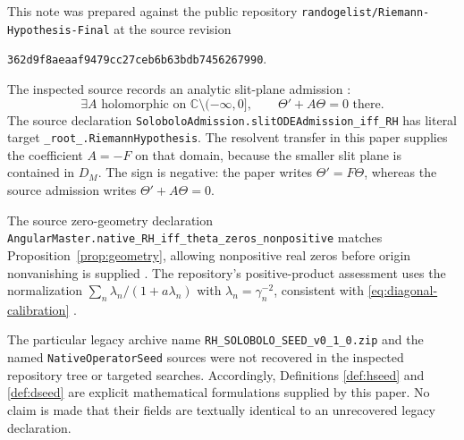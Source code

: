\documentclass[11pt,a4paper]{article}
\numberwithin{equation}{section}
\theoremstyle{definition}
\theoremstyle{remark}
\newcommand{\C}{\mathbb C}
\newcommand{\reposha}{\texttt{362d9f8aeaaf9479cc27ceb6b63bdb7456267990}}
\begin{document}
This note was prepared against the public repository
\texttt{randogelist/Riemann-Hypothesis-Final} at the source revision
\begin{center}\small\reposha.\end{center}
The inspected source records an analytic slit-plane admission
\cite{repo-ode}:
\begin{equation}\label{eq:repo-admission}
\exists A\text{ holomorphic on }\C\setminus(-\infty,0],\qquad
\Theta'+A\Theta=0\text{ there}.
\end{equation}
The source declaration
\nolinkurl{SoloboloAdmission.slitODEAdmission_iff_RH}
has literal target \texttt{\_root\_.RiemannHypothesis}.
The resolvent transfer in this paper supplies the coefficient
$A=-F$ on that domain, because the smaller slit plane is contained
in $D_M$. The sign is negative: the paper writes $\Theta'=F\Theta$,
whereas the source admission writes $\Theta'+A\Theta=0$.

The source zero-geometry declaration
\nolinkurl{AngularMaster.native_RH_iff_theta_zeros_nonpositive}
matches Proposition~\ref{prop:geometry}, allowing nonpositive real
zeros before origin nonvanishing is supplied \cite{repo-geometry}.
The repository's positive-product assessment uses the normalization
$\sum_n\lambda_n/(1+a\lambda_n)$ with
$\lambda_n=\gamma_n^{-2}$, consistent with
\eqref{eq:diagonal-calibration} \cite{repo-product}.

The particular legacy archive name
\nolinkurl{RH_SOLOBOLO_SEED_v0_1_0.zip} and the named
\texttt{NativeOperatorSeed} sources were not recovered in the inspected
repository tree or targeted searches. Accordingly, Definitions
\ref{def:hseed} and \ref{def:dseed} are explicit mathematical
formulations supplied by this paper. No claim is made that their
fields are textually identical to an unrecovered legacy declaration.
\end{document}
